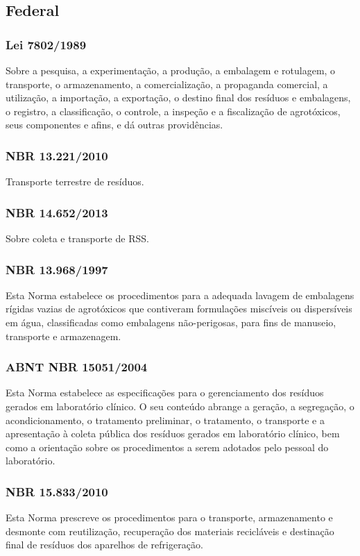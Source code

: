 \begin{subapend}
	\subsection{Federal}
	\begin{subsubapend}
		\item \subsubsection{Lei 7802/1989}
		Sobre a pesquisa, a experimentação, a produção, a embalagem e rotulagem, o transporte, o armazenamento, a comercialização, a propaganda comercial, a utilização, a importação, a exportação, o destino final dos resíduos e embalagens, o registro, a classificação, o controle, a inspeção e a fiscalização de agrotóxicos, seus componentes e afins, e dá outras providências.
		\subsubsection{NBR 13.221/2010}
		Transporte terrestre de resíduos.
		\subsubsection{NBR 14.652/2013}
		Sobre coleta e transporte de RSS.
		\subsubsection{NBR 13.968/1997}
		Esta Norma estabelece os procedimentos para a adequada lavagem de embalagens rígidas vazias de agrotóxicos que contiveram formulações miscíveis ou dispersíveis em água, classificadas como embalagens não-perigosas, para fins de manuseio, transporte e armazenagem.
		\subsubsection{ABNT NBR 15051/2004}
		Esta Norma estabelece as especificações para o gerenciamento dos resíduos gerados em laboratório clínico. O seu conteúdo abrange a geração, a segregação, o acondicionamento, o tratamento preliminar, o tratamento, o transporte e a apresentação à coleta pública dos resíduos gerados em laboratório clínico, bem como a orientação sobre os procedimentos a serem adotados pelo pessoal do laboratório.
		\subsubsection{NBR 15.833/2010}
		Esta Norma prescreve os procedimentos para o transporte, armazenamento e desmonte com reutilização, recuperação dos materiais recicláveis e destinação final de resíduos dos aparelhos de refrigeração.

\end{subsubapend}
\end{subapend}
